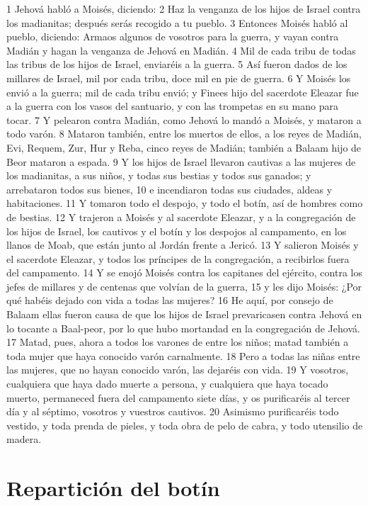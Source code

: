 1 Jehová habló a Moisés, diciendo:
2 Haz la venganza de los hijos de Israel contra los madianitas; después serás recogido a tu pueblo.
3 Entonces Moisés habló al pueblo, diciendo: Armaos algunos de vosotros para la guerra, y vayan contra Madián y hagan la venganza de Jehová en Madián.
4 Mil de cada tribu de todas las tribus de los hijos de Israel, enviaréis a la guerra.
5 Así fueron dados de los millares de Israel, mil por cada tribu, doce mil en pie de guerra.
6 Y Moisés los envió a la guerra; mil de cada tribu envió; y Finees hijo del sacerdote Eleazar fue a la guerra con los vasos del santuario, y con las trompetas en su mano para tocar.
7 Y pelearon contra Madián, como Jehová lo mandó a Moisés, y mataron a todo varón.
8 Mataron también, entre los muertos de ellos, a los reyes de Madián, Evi, Requem, Zur, Hur y Reba, cinco reyes de Madián; también a Balaam hijo de Beor mataron a espada.
9 Y los hijos de Israel llevaron cautivas a las mujeres de los madianitas, a sus niños, y todas sus bestias y todos sus ganados; y arrebataron todos sus bienes,
10 e incendiaron todas sus ciudades, aldeas y habitaciones.
11 Y tomaron todo el despojo, y todo el botín, así de hombres como de bestias.
12 Y trajeron a Moisés y al sacerdote Eleazar, y a la congregación de los hijos de Israel, los cautivos y el botín y los despojos al campamento, en los llanos de Moab, que están junto al Jordán frente a Jericó.
13 Y salieron Moisés y el sacerdote Eleazar, y todos los príncipes de la congregación, a recibirlos fuera del campamento.
14 Y se enojó Moisés contra los capitanes del ejército, contra los jefes de millares y de centenas que volvían de la guerra,
15 y les dijo Moisés: ¿Por qué habéis dejado con vida a todas las mujeres?
16 He aquí, por consejo de Balaam ellas fueron causa de que los hijos de Israel prevaricasen contra Jehová en lo tocante a Baal-peor, por lo que hubo mortandad en la congregación de Jehová.
17 Matad, pues, ahora a todos los varones de entre los niños; matad también a toda mujer que haya conocido varón carnalmente.
18 Pero a todas las niñas entre las mujeres, que no hayan conocido varón, las dejaréis con vida.
19 Y vosotros, cualquiera que haya dado muerte a persona, y cualquiera que haya tocado muerto, permaneced fuera del campamento siete días, y os purificaréis al tercer día y al séptimo, vosotros y vuestros cautivos.
20 Asimismo purificaréis todo vestido, y toda prenda de pieles, y toda obra de pelo de cabra, y todo utensilio de madera.
\section*{Repartición del botín}

